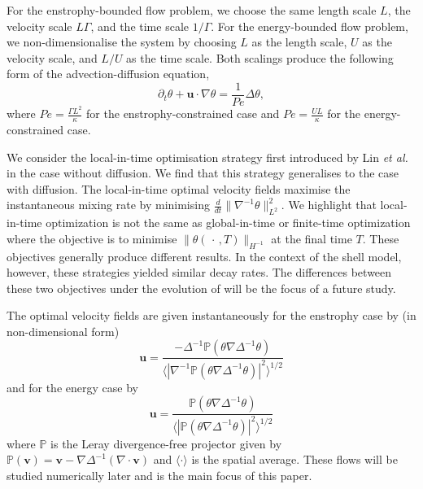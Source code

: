 \documentclass[12pt]{iopart}
\newcommand{\ddt}[1]{\frac{d #1}{dt}}
\newcommand{\hmone}[1]{\|\nabla^{-1} #1\|_{L^{2}}}
\renewcommand{\vec}[1]{\mathbf{#1}}
\newcommand{\ppt}[1]{\partial_{t} #1}
\newcommand{\lap}{\Delta }
\newcommand{\invlap}{\Delta^{-1}}
\begin{document}
For the enstrophy-bounded flow problem, we choose the same length scale $L$, the velocity scale $L\Gamma $, and  the time scale $1/\Gamma$. For the energy-bounded flow problem, we non-dimensionalise the system by choosing $L$ as the length scale, $U$ as the velocity scale, and $L/U$ as the time scale.  Both scalings produce the following form of the advection-diffusion equation,
\begin{equation}
\label{eq:nd_ade}
	\ppt{\theta}+\mathbf{u}\cdot \nabla \theta=\frac{1}{Pe} \lap\theta,
\end{equation}
where $Pe=  \frac{\Gamma L^2}{\kappa}$ for the enstrophy-constrained case and $Pe= \frac{UL}{\kappa}$ for the energy-constrained case.   

We consider the local-in-time optimisation strategy first introduced by Lin {\it et al.} \cite{JFM2011} in the case without diffusion. We find that this strategy generalises to the case with diffusion. The local-in-time optimal velocity fields maximise the instantaneous mixing rate by minimising $\ddt{}\hmone{\theta}^2$. We highlight that local-in-time optimization is not the same as global-in-time or finite-time optimization where the objective is to minimise $\|\theta(\,\cdot\, , T)\|_{H^{-1}}$ at the final time $T$. These objectives generally produce different results.  In the context of the shell model, however, these strategies yielded similar decay rates. The differences between these two objectives under the evolution of    will be the focus of a future study. 

The optimal velocity fields are given instantaneously for the enstrophy case by (in non-dimensional form)
%
\begin{equation}
\label{eq:u_lit_enstrophy}
\mathbf{u}= \frac{-\invlap\mathbb{P}(\theta \nabla \invlap\theta)}{\langle |\nabla^{-1}\mathbb{P}(\theta \nabla \invlap\theta)|^2\rangle^{1/2}}
\end{equation}
%
and for the energy case by 
% 
\begin{equation}
\label{eq:u_lit_energy}
\mathbf{u}= \frac{\mathbb{P}(\theta \nabla \invlap\theta)}{\langle |\mathbb{P}(\theta \nabla \invlap\theta)|^2\rangle^{1/2}}
\end{equation} 
%
where $\mathbb{P}$ is the Leray divergence-free projector given by $\mathbb{P}(\vec{v}) = \vec{v} - \nabla \Delta^{-1}(\nabla \cdot \vec{v})$ and $\langle \cdot \rangle$ is the spatial average. These flows will be studied numerically later and is the main focus of this paper.
\end{document}
